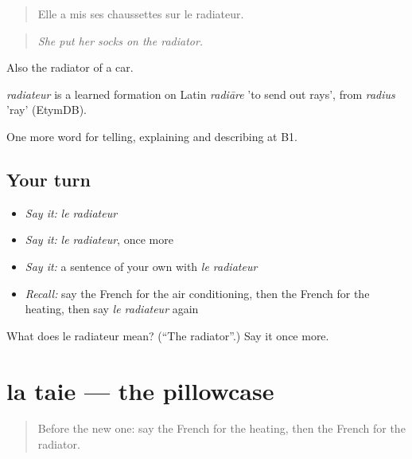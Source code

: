 \begin{quote}
Elle a mis ses chaussettes sur le radiateur.
\end{quote}

\begin{quote}
\emph{She put her socks on the radiator.}
\end{quote}

Also the radiator of a car.

\begin{cousinweb}
\emph{radiateur} is a learned formation on Latin \emph{radiāre} 'to send out rays', from \emph{radius} 'ray' (EtymDB).
\end{cousinweb}

\begin{grammarlens}[title={What you've built}]
One more word for telling, explaining and describing at B1.
\end{grammarlens}

\subsection*{Your turn}
\begin{itemize}
\raggedright
  \item \emph{Say it:} \emph{le radiateur}
  \item \emph{Say it:} \emph{le radiateur}, once more
  \item \emph{Say it:} a sentence of your own with \emph{le radiateur}
  \item \emph{Recall:} say the French for the air conditioning, then the French for the heating, then say \emph{le radiateur} again
\end{itemize}

\begin{tcolorbox}[breakable,colback=teal!4,colframe=teal!35!black,title={Before you move on}]
What does le radiateur mean? (\textquotedblleft{}The radiator\textquotedblright{}.) Say it once more.
\end{tcolorbox}
\section[la taie]{la taie — the pillowcase}

\label{lesson:FR-C427-taie}



\begin{quote}
Before the new one: say the French for the heating, then the French for the radiator.
\end{quote}

